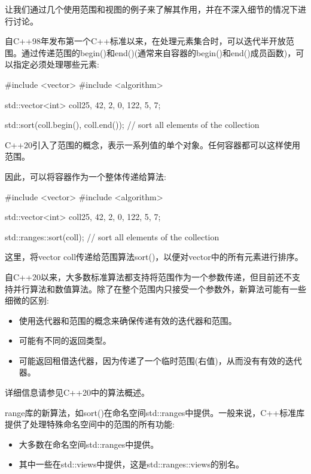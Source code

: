 

让我们通过几个使用范围和视图的例子来了解其作用，并在不深入细节的情况下进行讨论。


自C++98年发布第一个C++标准以来，在处理元素集合时，可以迭代半开放范围。通过传递范围的begin()和end()(通常来自容器的begin()和end()成员函数)，可以指定必须处理哪些元素:

\begin{cpp}
#include <vector>
#include <algorithm>

std::vector<int> coll{25, 42, 2, 0, 122, 5, 7};

std::sort(coll.begin(), coll.end()); // sort all elements of the collection
\end{cpp}

C++20引入了范围的概念，表示一系列值的单个对象。任何容器都可以这样使用范围。

因此，可以将容器作为一个整体传递给算法:

\begin{cpp}
#include <vector>
#include <algorithm>

std::vector<int> coll{25, 42, 2, 0, 122, 5, 7};

std::ranges::sort(coll); // sort all elements of the collection
\end{cpp}

这里，将vector coll传递给范围算法sort()，以便对vector中的所有元素进行排序。

自C++20以来，大多数标准算法都支持将范围作为一个参数传递，但目前还不支持并行算法和数值算法。除了在整个范围内只接受一个参数外，新算法可能有一些细微的区别:

\begin{itemize}
\item
使用迭代器和范围的概念来确保传递有效的迭代器和范围。

\item
可能有不同的返回类型。

\item
可能返回租借迭代器，因为传递了一个临时范围(右值)，从而没有有效的迭代器。
\end{itemize}

详细信息请参见C++20中的算法概述。


range库的新算法，如sort()在命名空间std::ranges中提供。一般来说，C++标准库提供了处理特殊命名空间中的范围的所有功能:

\begin{itemize}
\item
大多数在命名空间std::ranges中提供。

\item
其中一些在std::views中提供，这是std::ranges::views的别名。
\end{itemize}

